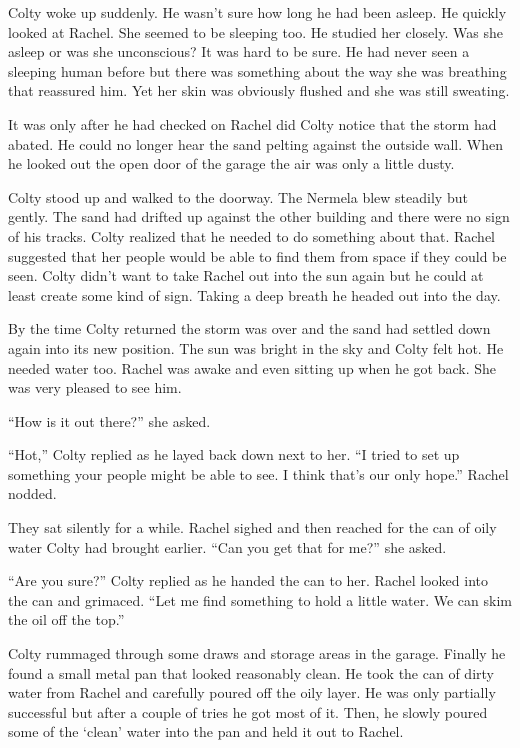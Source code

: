 \breakpoint

Colty woke up suddenly. He wasn't sure how long he had been asleep. He quickly looked at Rachel.
She seemed to be sleeping too. He studied her closely. Was she asleep or was she unconscious? It
was hard to be sure. He had never seen a sleeping human before but there was something about the
way she was breathing that reassured him. Yet her skin was obviously flushed and she was still
sweating.

It was only after he had checked on Rachel did Colty notice that the storm had abated. He could
no longer hear the sand pelting against the outside wall. When he looked out the open door of
the garage the air was only a little dusty.

Colty stood up and walked to the doorway. The Nermela blew steadily but gently. The sand had
drifted up against the other building and there were no sign of his tracks. Colty realized that
he needed to do something about that. Rachel suggested that her people would be able to find
them from space if they could be seen. Colty didn't want to take Rachel out into the sun again
but he could at least create some kind of sign. Taking a deep breath he headed out into the day.

By the time Colty returned the storm was over and the sand had settled down again into its new
position. The sun was bright in the sky and Colty felt hot. He needed water too. Rachel was
awake and even sitting up when he got back. She was very pleased to see him.

``How is it out there?'' she asked.

``Hot,'' Colty replied as he layed back down next to her. ``I tried to set up something your
people might be able to see. I think that's our only hope.'' Rachel nodded.

They sat silently for a while. Rachel sighed and then reached for the can of oily water Colty
had brought earlier. ``Can you get that for me?'' she asked.

``Are you sure?'' Colty replied as he handed the can to her. Rachel looked into the can and
grimaced. ``Let me find something to hold a little water. We can skim the oil off the top.''

Colty rummaged through some draws and storage areas in the garage. Finally he found a small
metal pan that looked reasonably clean. He took the can of dirty water from Rachel and carefully
poured off the oily layer. He was only partially successful but after a couple of tries he got
most of it. Then, he slowly poured some of the `clean' water into the pan and held it out to
Rachel.

